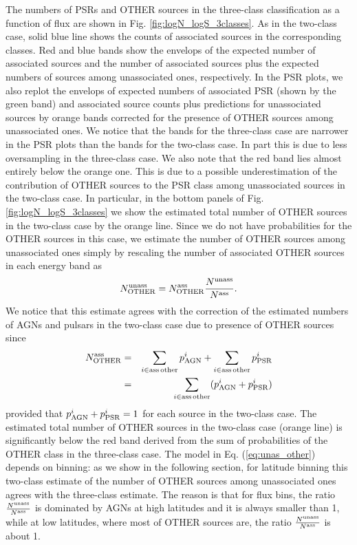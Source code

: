 \documentclass[referee]{aa} %
\newcommand{\bea}{\begin{eqnarray}}
\newcommand{\eea}{\end{eqnarray}}
\newcommand{\lb}{\label}
\begin{document}
The numbers of PSRs and OTHER sources in the three-class classification as a function of flux are shown in Fig. \ref{fig:logN_logS_3classes}.
As in the two-class case, solid blue line shows the counts of associated sources in the corresponding classes.
Red and blue bands show the envelops of the expected number of associated sources and the number of associated sources plus the expected numbers of sources among unassociated ones, respectively.
In the PSR plots, we also replot the envelops of expected numbers of associated PSR (shown by the green band) and associated source counts plus predictions for unassociated sources by orange bands corrected for the presence of OTHER sources among unassociated ones.
We notice that the bands for the three-class case are narrower in the PSR plots than the bands for the two-class case.
In part this is due to less oversampling in the three-class case. 
We also note that the red band lies almost entirely below the orange one.
This is due to a possible underestimation of the contribution of OTHER sources to the PSR class among unassociated sources
in the two-class case.
In particular, in the bottom panels of Fig. \ref{fig:logN_logS_3classes} we show the estimated total number of OTHER sources in the two-class case by the orange line.
Since we do not have probabilities for the OTHER sources in this case, we estimate the number of OTHER sources among unassociated ones 
simply by rescaling the number of associated OTHER sources in each energy band as
\bea
\lb{eq:unas_other}
N_{\rm OTHER}^{\rm unass} = N_{\rm OTHER}^{\rm ass} \frac{N^{\rm unass}}{N^{\rm ass}}
.\eea
We notice that this estimate agrees with the correction of the estimated numbers of AGNs and pulsars in the two-class case due to presence of OTHER sources since
\bea
\nonumber
N_{\rm OTHER}^{\rm ass} &=& \sum_{i \in \rm ass\,other} p^i_{\rm AGN} + \sum_{i \in \rm ass\,other} p^i_{\rm PSR} \\
&=& \sum_{i \in \rm ass\,other} (p^i_{\rm AGN} + p^i_{\rm PSR})
\eea
provided that $p^i_{\rm AGN} + p^i_{\rm PSR} = 1$ for each source in the two-class case.
The estimated total number of OTHER sources in the two-class case (orange line) is significantly below the red band derived from the sum of probabilities of the OTHER class in the three-class case.
The model in Eq. (\ref{eq:unas_other}) depends on binning: as we show in the following section, for latitude binning this two-class
estimate of the number of OTHER sources among unassociated ones agrees with the three-class estimate.
The reason is that for flux bins, the ratio $\frac{N^{\rm unass}}{N^{\rm ass}}$ is dominated by AGNs at high latitudes and it is always smaller than 1, while at low latitudes, where most of OTHER sources are, the ratio $\frac{N^{\rm unass}}{N^{\rm ass}}$ is about 1.
\end{document}
